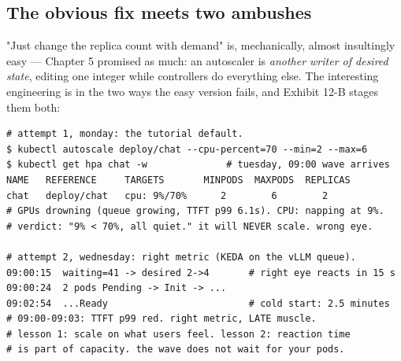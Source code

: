 \subsection*{The obvious fix meets two ambushes}

"Just change the replica count with demand" is, mechanically, almost insultingly easy — Chapter 5 promised as much: an autoscaler is \textit{another writer of desired state}, editing one integer while controllers do everything else. The interesting engineering is in the two ways the easy version fails, and Exhibit 12-B stages them both:

\begin{terminalbox}
\begin{Verbatim}[breaklines=true,breakanywhere=true,fontsize=\small,formatcom=\color{tbbtermfg},codes=\tbbcodeactive]
# attempt 1, monday: the tutorial default.
$ kubectl autoscale deploy/chat --cpu-percent=70 --min=2 --max=6
$ kubectl get hpa chat -w              # tuesday, 09:00 wave arrives
NAME   REFERENCE     TARGETS       MINPODS  MAXPODS  REPLICAS
chat   deploy/chat   cpu: 9%/70%      2        6        2
# GPUs drowning (queue growing, TTFT p99 6.1s). CPU: napping at 9%.
# verdict: "9% < 70%, all quiet." it will NEVER scale. wrong eye.

# attempt 2, wednesday: right metric (KEDA on the vLLM queue).
09:00:15  waiting=41 -> desired 2->4       # right eye reacts in 15 s
09:00:24  2 pods Pending -> Init -> ...
09:02:54  ...Ready                         # cold start: 2.5 minutes
# 09:00-09:03: TTFT p99 red. right metric, LATE muscle.
# lesson 1: scale on what users feel. lesson 2: reaction time
# is part of capacity. the wave does not wait for your pods.
\end{Verbatim}
\end{terminalbox}

